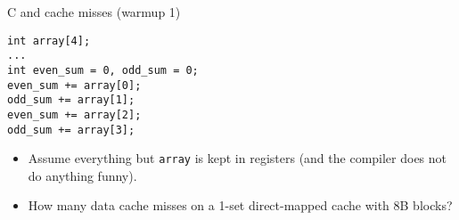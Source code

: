 \usetikzlibrary{decorations.pathreplacing,matrix}

\begin{frame}[fragile,label=arrayMissesWarmup1]{C and cache misses (warmup 1)}
\begin{lstlisting}
int array[4];
...
int even_sum = 0, odd_sum = 0;
even_sum += array[0];
odd_sum += array[1];
even_sum += array[2];
odd_sum += array[3];
\end{lstlisting}
\begin{itemize}
\item {\small
Assume everything but {\tt array} is kept in registers (and the compiler does not do
anything funny).}
\item How many data cache misses on a 1-set direct-mapped cache with 8B blocks?
\end{itemize}
\end{frame}

